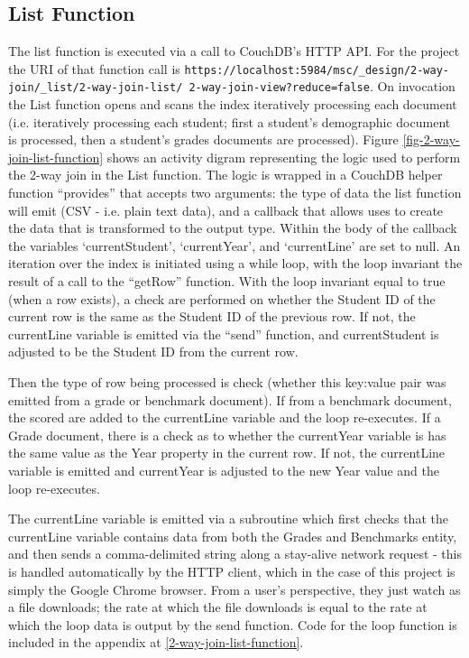 \subsection{List Function}
The list function is executed via a call to CouchDB's HTTP API. For the project the URI of that function call is \texttt{https://localhost:5984/msc/\_design/2-way-join/\_list/2-way-join-list/ 2-way-join-view?reduce=false}. On invocation the List function opens and scans the index iteratively processing each document (i.e. iteratively processing each student; first a student's demographic document is processed, then a student's grades documents are processed). Figure \ref{fig-2-way-join-list-function} shows an activity digram representing the logic used to perform the 2-way join in the List function. The logic is wrapped in a CouchDB helper function ``provides'' that accepts two arguments: the type of data the list function will emit (CSV - i.e. plain text data), and a callback that allows uses to create the data that is transformed to the output type. Within the body of the callback the variables `currentStudent', `currentYear', and `currentLine' are set to null. An iteration over the index is initiated using a while loop, with the loop invariant the result of a call to the ``getRow'' function. With the loop invariant equal to true (when a row exists), a check are performed on whether the Student ID of the current row is the same as the Student ID of the previous row. If not, the currentLine variable is emitted via the ``send'' function, and currentStudent is adjusted to be the Student ID from the current row.

Then the type of row being processed is check (whether this key:value pair was emitted from a grade or benchmark document). If from a benchmark document, the scored are added to the currentLine variable and the loop re-executes. If a Grade document, there is a check as to whether the currentYear variable is has the same value as the Year property in the current row. If not, the currentLine variable is emitted and currentYear is adjusted to the new Year value and the loop re-executes.

The currentLine variable is emitted via a subroutine which first checks that the currentLine variable contains data from both the Grades and Benchmarks entity, and then sends a comma-delimited string along a stay-alive network request - this is handled automatically by the HTTP client, which in the case of this project is simply the Google Chrome browser. From a user's perspective, they just watch as a file downloads; the rate at which the file downloads is equal to the rate at which the loop data is output by the send function. Code for the loop function is included in the appendix at \ref{2-way-join-list-function}.

